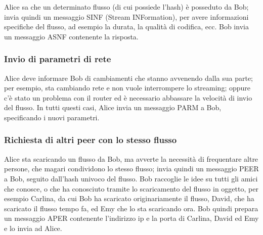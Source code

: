 Alice sa che un determinato flusso (di cui possiede l'hash) è posseduto da Bob;
invia quindi un messaggio SINF (Stream INFormation), per avere informazioni
specifiche del flusso, ad esempio la durata, la qualità di codifica, ecc. Bob
invia un messaggio ASNF contenente la risposta.






\subsubsection{Invio di parametri di rete}
%

Alice deve informare Bob di cambiamenti che stanno avvenendo dalla sua parte; per
esempio, sta cambiando rete e non vuole interrompere lo streaming; oppure c'è
stato un problema con il router ed è necessario abbassare la velocità di invio
del flusso. In tutti questi casi, Alice invia un messaggio PARM a Bob,
specificando i nuovi parametri.






\subsubsection{Richiesta di altri peer con lo stesso flusso}
%

Alice sta scaricando un flusso da Bob, ma avverte la necessità di frequentare
altre persone, che magari condividono lo stesso flusso; invia quindi un messaggio
PEER a Bob, seguito dall'hash univoco del flusso. Bob raccoglie le idee su tutti
gli amici che conosce, o che ha conosciuto tramite lo scaricamento del flusso in
oggetto, per esempio Carlina, da cui Bob ha scaricato originariamente il flusso,
David, che ha scaricato il flusso tempo fa, ed Emy che lo sta scaricando ora. Bob
quindi prepara un messaggio APER contenente l'indirizzo ip e la porta di Carlina,
David ed Emy e lo invia ad Alice.









